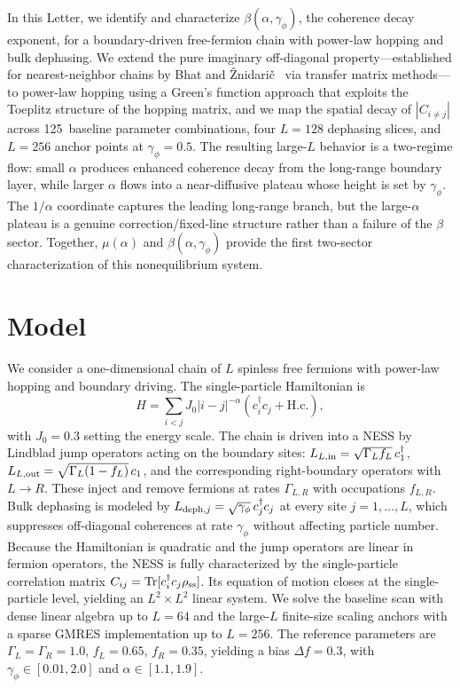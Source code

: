 \documentclass[aps,prd,twocolumn,superscriptaddress,floatfix]{revtex4-2}
\begin{document}
In this Letter, we identify and characterize
$\beta(\alpha,\gamma_\phi)$, the coherence decay exponent, for a
boundary-driven free-fermion chain with power-law hopping and bulk
dephasing. We extend the pure imaginary off-diagonal
property---established for nearest-neighbor chains by Bhat and
\v{Z}nidari\v{c}~\cite{Bhat2025} via transfer matrix methods---to
power-law hopping using a Green's function approach that exploits the
Toeplitz structure of the hopping matrix, and we map the spatial decay
of $|C_{i\neq j}|$ across 125~baseline parameter combinations, four
$L=128$ dephasing slices, and $L=256$ anchor points at
$\gamma_\phi=0.5$. The resulting large-$L$ behavior is a two-regime
flow: small $\alpha$ produces enhanced coherence decay from the
long-range boundary layer, while larger $\alpha$ flows into a
near-diffusive plateau whose height is set by $\gamma_\phi$. The
$1/\alpha$ coordinate captures the leading long-range branch, but the
large-$\alpha$ plateau is a genuine correction/fixed-line structure
rather than a failure of the $\beta$ sector. Together, $\mu(\alpha)$
and $\beta(\alpha,\gamma_\phi)$ provide the first two-sector
characterization of this nonequilibrium system.

\section{Model}

We consider a one-dimensional chain of $L$ spinless free fermions
with power-law hopping and boundary driving. The single-particle
Hamiltonian is
\begin{equation}
H = \sum_{i<j} J_0 |i-j|^{-\alpha} (c_i^\dagger c_j + \text{H.c.}),
\label{eq:Hamiltonian}
\end{equation}
with $J_0 = 0.3$ setting the energy scale. The chain is driven into a
NESS by Lindblad jump operators acting on the boundary sites:
$L_{L,\rm in} = \sqrt{\Gamma_L f_L}\,c_1^\dagger$,
$L_{L,\rm out} = \sqrt{\Gamma_L(1-f_L)}\,c_1$, and the corresponding
right-boundary operators with $L\to R$. These inject and remove
fermions at rates $\Gamma_{L,R}$ with occupations $f_{L,R}$. Bulk
dephasing is modeled by $L_{{\rm deph},j} = \sqrt{\gamma_\phi}\,
c_j^\dagger c_j$ at every site $j=1,\dots,L$, which suppresses
off-diagonal coherences at rate $\gamma_\phi$ without affecting
particle number. Because the Hamiltonian is quadratic and the jump
operators are linear in fermion operators, the NESS is fully
characterized by the single-particle correlation matrix
$C_{ij} = \text{Tr}[c_i^\dagger c_j \rho_{\rm ss}]$. Its equation of
motion closes at the single-particle level, yielding an
$L^2 \times L^2$ linear system. We solve the baseline scan with dense
linear algebra up to $L=64$ and the large-$L$ finite-size scaling
anchors with a sparse GMRES implementation up to $L=256$. The
reference parameters are $\Gamma_L = \Gamma_R = 1.0$, $f_L = 0.65$,
$f_R = 0.35$, yielding a bias $\Delta f = 0.3$, with
$\gamma_\phi \in [0.01, 2.0]$ and $\alpha \in [1.1, 1.9]$.
\end{document}
